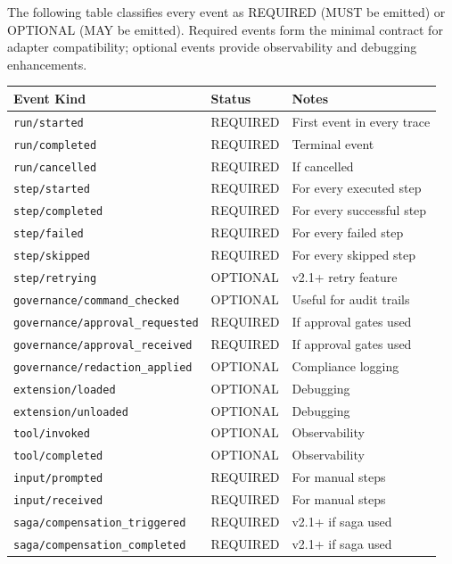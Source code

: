 The following table classifies every event as REQUIRED (MUST be emitted) or OPTIONAL (MAY be emitted). Required events form the minimal contract for adapter compatibility; optional events provide observability and debugging enhancements.

\begin{center}
\small
\begin{tabular}{llp{6cm}}
\textbf{Event Kind} & \textbf{Status} & \textbf{Notes} \\
\hline
\texttt{run/started} & REQUIRED & First event in every trace \\
\texttt{run/completed} & REQUIRED & Terminal event \\
\texttt{run/cancelled} & REQUIRED & If cancelled \\
\texttt{step/started} & REQUIRED & For every executed step \\
\texttt{step/completed} & REQUIRED & For every successful step \\
\texttt{step/failed} & REQUIRED & For every failed step \\
\texttt{step/skipped} & REQUIRED & For every skipped step \\
\texttt{step/retrying} & OPTIONAL & v2.1+ retry feature \\
\texttt{governance/command\_checked} & OPTIONAL & Useful for audit trails \\
\texttt{governance/approval\_requested} & REQUIRED & If approval gates used \\
\texttt{governance/approval\_received} & REQUIRED & If approval gates used \\
\texttt{governance/redaction\_applied} & OPTIONAL & Compliance logging \\
\texttt{extension/loaded} & OPTIONAL & Debugging \\
\texttt{extension/unloaded} & OPTIONAL & Debugging \\
\texttt{tool/invoked} & OPTIONAL & Observability \\
\texttt{tool/completed} & OPTIONAL & Observability \\
\texttt{input/prompted} & REQUIRED & For manual steps \\
\texttt{input/received} & REQUIRED & For manual steps \\
\texttt{saga/compensation\_triggered} & REQUIRED & v2.1+ if saga used \\
\texttt{saga/compensation\_completed} & REQUIRED & v2.1+ if saga used \\
\end{tabular}
\end{center}

